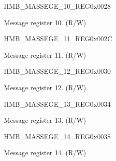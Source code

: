 \begin{register}{H}{MB\_MASSEGE\_10\_REG}{0x0028}\label{regdesc:MBMESSAGE10REG}
%
\regnewline%
\begin{regdesc}\begin{reglist}
\label{fielddesc:MBMESSAGE10}\item [MB\_MASSEGE\_10] Message register 10. (R/W)
\end{reglist}\end{regdesc}
\end{register}


\begin{register}{H}{MB\_MASSEGE\_11\_REG}{0x002C}\label{regdesc:MBMESSAGE11REG}
%
\regnewline%
\begin{regdesc}\begin{reglist}
\label{fielddesc:MBMESSAGE11}\item [MB\_MASSEGE\_11] Message register 11. (R/W)
\end{reglist}\end{regdesc}
\end{register}


\begin{register}{H}{MB\_MASSEGE\_12\_REG}{0x0030}\label{regdesc:MBMESSAGE12REG}
%
\regnewline%
\begin{regdesc}\begin{reglist}
\label{fielddesc:MBMESSAGE12}\item [MB\_MASSEGE\_12] Message register 12. (R/W)
\end{reglist}\end{regdesc}
\end{register}


\begin{register}{H}{MB\_MASSEGE\_13\_REG}{0x0034}\label{regdesc:MBMESSAGE13REG}
%
\regnewline%
\begin{regdesc}\begin{reglist}
\label{fielddesc:MBMESSAGE13}\item [MB\_MASSEGE\_13] Message register 13. (R/W)
\end{reglist}\end{regdesc}
\end{register}


\begin{register}{H}{MB\_MASSEGE\_14\_REG}{0x0038}\label{regdesc:MBMESSAGE14REG}
%
\regnewline%
\begin{regdesc}\begin{reglist}
\label{fielddesc:MBMESSAGE14}\item [MB\_MASSEGE\_14] Message register 14. (R/W)
\end{reglist}\end{regdesc}
\end{register}


